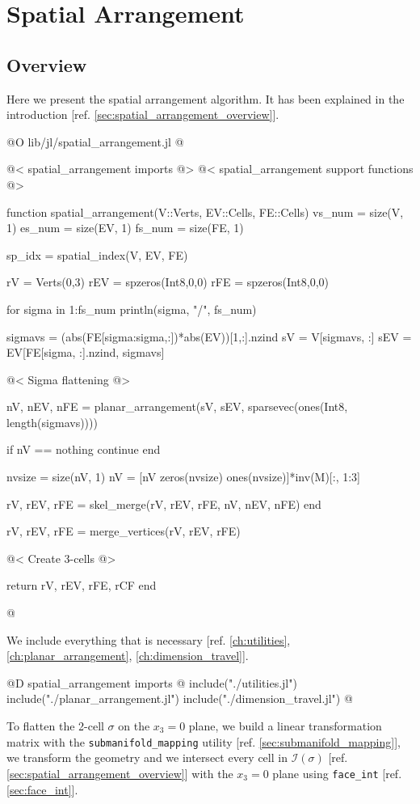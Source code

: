 \chapter{Spatial Arrangement}

\section{Overview}
Here we present the spatial arrangement algorithm.
It has been explained in the introduction [ref. \ref{sec:spatial_arrangement_overview}].

@O lib/jl/spatial_arrangement.jl
@{@< spatial\_arrangement imports @>
@< spatial\_arrangement support functions @>

function spatial_arrangement(V::Verts, EV::Cells, FE::Cells)
    vs_num = size(V, 1)
    es_num = size(EV, 1)
    fs_num = size(FE, 1)

    sp_idx = spatial_index(V, EV, FE)

    rV = Verts(0,3)
    rEV = spzeros(Int8,0,0)
    rFE = spzeros(Int8,0,0)

    for sigma in 1:fs_num
        println(sigma, "/", fs_num)

        sigmavs = (abs(FE[sigma:sigma,:])*abs(EV))[1,:].nzind 
        sV = V[sigmavs, :]
        sEV = EV[FE[sigma, :].nzind, sigmavs]

        @< Sigma flattening @>

        nV, nEV, nFE = planar_arrangement(sV, sEV, sparsevec(ones(Int8, length(sigmavs))))

        if nV == nothing
            continue
        end
        
        nvsize = size(nV, 1)
        nV = [nV zeros(nvsize) ones(nvsize)]*inv(M)[:, 1:3]

        rV, rEV, rFE = skel_merge(rV, rEV, rFE, nV, nEV, nFE)
    end

    rV, rEV, rFE = merge_vertices(rV, rEV, rFE)

    @< Create 3-cells @>

    return rV, rEV, rFE, rCF
end

@}

We include everything that is necessary 
[ref. \ref{ch:utilities}, \ref{ch:planar_arrangement}, \ref{ch:dimension_travel}].

@D spatial\_arrangement imports
@{
include("./utilities.jl")
include("./planar_arrangement.jl")
include("./dimension_travel.jl")
@}

To flatten the 2-cell $\sigma$ on the $x_3=0$ plane,
we build a linear transformation matrix with the
\texttt{submanifold\_mapping} utility [ref. \ref{sec:submanifold_mapping}],
we transform the geometry and we intersect every cell in $\mathcal{I}(\sigma)$
[ref. \ref{sec:spatial_arrangement_overview}]
with the $x_3=0$ plane using \texttt{face\_int} [ref. \ref{sec:face_int}].

